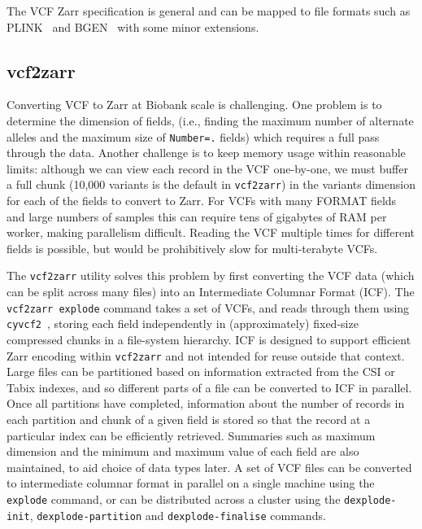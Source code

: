 \documentclass[a4paper,num-refs]{oup-contemporary}
\begin{document}
The VCF Zarr specification is general and can be mapped to
file formats such as PLINK~\citep{purcell2007plink,chang2015second}
and BGEN~\citep{band2018bgen} with some minor extensions.

\subsection{vcf2zarr}
Converting VCF to Zarr at Biobank scale is challenging.
One problem is to determine the dimension of fields,
(i.e., finding the maximum number of alternate alleles and the
maximum size of \texttt{Number=.} fields) which requires a full
pass through the data. Another challenge is to keep
memory usage within reasonable limits: although
we can view each record in the VCF one-by-one,
we must buffer a full chunk (10,000 variants is the default in
\texttt{vcf2zarr})
in the variants dimension for each of the fields to convert to Zarr.
For VCFs with many FORMAT fields and large numbers of samples this can
require tens of gigabytes of RAM per worker, making
parallelism difficult. Reading the VCF multiple times for different fields
is possible, but would be prohibitively slow for multi-terabyte VCFs.

The \texttt{vcf2zarr} utility solves this problem by first converting
the VCF data (which can be split across many files) into an Intermediate
Columnar Format (ICF). The \texttt{vcf2zarr explode} command takes a set
of VCFs, and reads through them using
\texttt{cyvcf2}~\cite{pedersen2017cyvcf2},
storing each field independently in (approximately) fixed-size
compressed chunks in a file-system hierarchy.
ICF is designed to support efficient Zarr encoding within \texttt{vcf2zarr}
and not intended for reuse outside that context.
Large files can be partitioned based on information extracted from the
CSI or Tabix indexes, and so different parts of a file can be
converted to ICF in parallel.
Once all partitions have completed, information about
the number of records in each partition and chunk of a given
field is stored so that the record at a particular index
can be efficiently retrieved.
Summaries such as maximum dimension and the minimum and maximum value
of each field are also maintained, to aid choice of data types later.
A set of VCF files can be converted to intermediate columnar
format in parallel on a single machine
using the \texttt{explode} command,
or can be distributed across a cluster using the
\texttt{dexplode-init},
\texttt{dexplode-partition} and \texttt{dexplode-finalise} commands.
\end{document}
